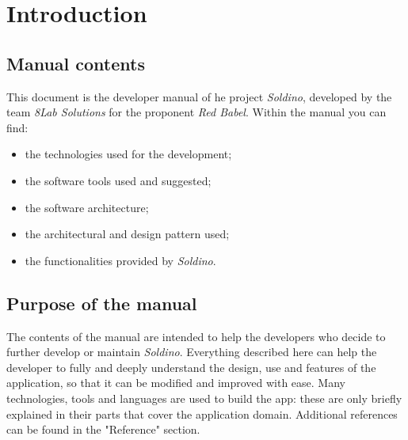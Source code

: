 \section{Introduction} 
\subsection{Manual contents}
This document is the developer manual of he project \textit{Soldino}, developed by the team \textit{8Lab Solutions} for the proponent \textit{Red Babel}.\newline
Within the manual you can find:
\begin{itemize}
	\item the technologies used for the development;
	\item the software tools used and suggested;
	\item the software architecture;
	\item the architectural and design pattern used;
	\item the functionalities provided by \textit{Soldino}.
\end{itemize}

\subsection{Purpose of the manual}
The contents of the manual are intended to help the developers who decide to further develop or maintain \textit{Soldino}. Everything described here can help the developer to fully and deeply understand the design, use and features of the application, so that it can be modified and improved with ease.\newline
Many technologies, tools and languages are used to build the app: these are only briefly explained in their parts that cover the application domain. Additional references can be found in the "Reference" section.


